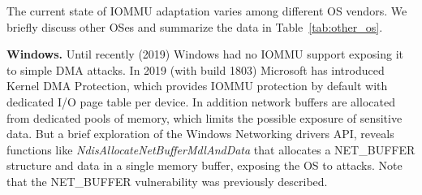 \begin{table*}[t]
  \caption{IOMMU adaptation in different OS's (* stands for previously known but yet untested, in the new version, vulnerabilities.}
  \label{tab:other_os}
\end{table*}

The current state of IOMMU adaptation varies among different OS vendors. We briefly discuss other OSes and summarize the data in Table~\ref{tab:other_os}. 

\smallskip
\noindent\textbf{Windows.} Until recently (2019) Windows had no IOMMU support exposing it to simple DMA attacks\cite{thunder}.
In 2019 (with build 1803) Microsoft has introduced Kernel DMA Protection\cite{ms_iommu}, which provides IOMMU protection by default with dedicated I/O page table per device. 
In addition network buffers are allocated from dedicated pools of memory, which limits the possible exposure of sensitive data. But a brief exploration of the Windows Networking drivers API, reveals functions like \emph{NdisAllocateNetBufferMdlAndData}\cite{ms_single} that allocates a NET\_BUFFER structure and data in a single memory buffer, exposing the OS to \simple attacks. Note that the NET\_BUFFER vulnerability was previously described\cite{thunder}. 

